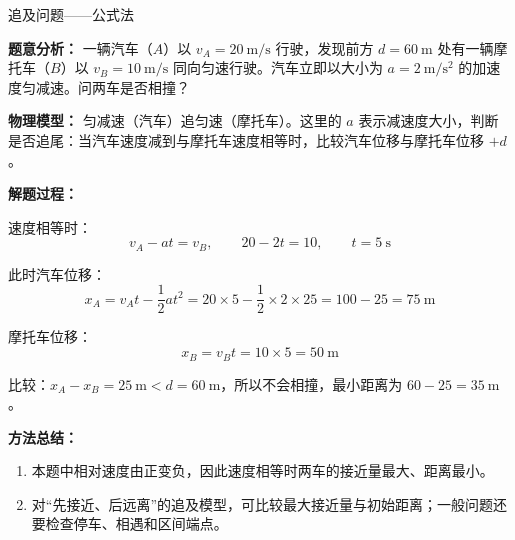 \begin{examplebox}{追及问题——公式法}

\textbf{题意分析：} 一辆汽车（$A$）以 $v_A = 20\ \mathrm{m/s}$ 行驶，发现前方 $d = 60\ \mathrm{m}$ 处有一辆摩托车（$B$）以 $v_B = 10\ \mathrm{m/s}$ 同向匀速行驶。汽车立即以大小为 $a = 2\ \mathrm{m/s^2}$ 的加速度匀减速。问两车是否相撞？

\textbf{物理模型：} 匀减速（汽车）追匀速（摩托车）。这里的 $a$ 表示减速度大小，判断是否追尾：当汽车速度减到与摩托车速度相等时，比较汽车位移与摩托车位移 $+ d$。

\textbf{解题过程：}

速度相等时：
\[
v_A - a t = v_B,\qquad 20 - 2t = 10,\qquad t = 5\ \mathrm{s}
\]

此时汽车位移：
\[
x_A = v_A t - \frac12 a t^2 = 20 \times 5 - \frac12 \times 2 \times 25 = 100 - 25 = 75\ \mathrm{m}
\]

摩托车位移：
\[
x_B = v_B t = 10 \times 5 = 50\ \mathrm{m}
\]

比较：$x_A - x_B = 25\ \mathrm{m} < d = 60\ \mathrm{m}$，所以不会相撞，最小距离为 $60 - 25 = 35\ \mathrm{m}$。

\textbf{方法总结：}
\begin{enumerate}
  \item 本题中相对速度由正变负，因此速度相等时两车的接近量最大、距离最小。
  \item 对“先接近、后远离”的追及模型，可比较最大接近量与初始距离；一般问题还要检查停车、相遇和区间端点。
\end{enumerate}

\end{examplebox}

